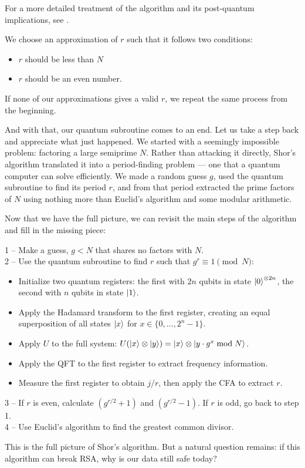 For a more detailed treatment of the algorithm and its post-quantum
implications, see \cite{watkins}.

We choose an approximation of $r$ such that it follows two conditions:

\begin{tcolorbox}[colframe=smjcrimson, colback=smjlightcrimson,
                  sharp corners, boxrule=0.5pt]
\begin{itemize}
  \item[1--] $r$ should be less than $N$
  \item[2--] $r$ should be an even number.
\end{itemize}
\end{tcolorbox}

If none of our approximations gives a valid $r$, we repeat the same process
from the beginning.

And with that, our quantum subroutine comes to an end. Let us take a step back
and appreciate what just happened. We started with a seemingly impossible
problem: factoring a large semiprime $N$. Rather than attacking it directly,
Shor's algorithm translated it into a period-finding problem --- one that a
quantum computer can solve efficiently. We made a random guess $g$, used the
quantum subroutine to find its period $r$, and from that period extracted the
prime factors of $N$ using nothing more than Euclid's algorithm and some
modular arithmetic.

Now that we have the full picture, we can revisit the main steps of the
algorithm and fill in the missing piece:

\begin{tcolorbox}[colframe=smjcrimson, colback=smjlightcrimson,
                  sharp corners, boxrule=0.5pt, breakable]
1 -- Make a guess, $g < N$ that shares no factors with $N$.\\[0.5em]
2 -- Use the quantum subroutine to find $r$ such that
     $g^r \equiv 1 \pmod{N}$:
\begin{itemize}
    \item Initialize two quantum registers: the first with $2n$ qubits in
          state $\ket{0}^{\otimes 2n}$, the second with $n$ qubits in
          state $\ket{1}$.
    \item Apply the Hadamard transform to the first register, creating an
          equal superposition of all states $\ket{x}$ for
          $x \in \{0, \ldots, 2^n - 1\}$.
    \item Apply $U$ to the full system:
          $U(\ket{x} \otimes \ket{y}) = \ket{x} \otimes \ket{y \cdot g^x \bmod N}$.
    \item Apply the QFT to the first register to extract frequency information.
    \item Measure the first register to obtain $j/r$, then apply the CFA
          to extract $r$.
\end{itemize}
\vspace{0.5em}
3 -- If $r$ is even, calculate $(g^{r/2} + 1)$ and $(g^{r/2} - 1)$.
     If $r$ is odd, go back to step 1.\\[0.5em]
4 -- Use Euclid's algorithm to find the greatest common divisor.
\end{tcolorbox}

This is the full picture of Shor's algorithm. But a natural question remains:
if this algorithm can break RSA, why is our data still safe today?
